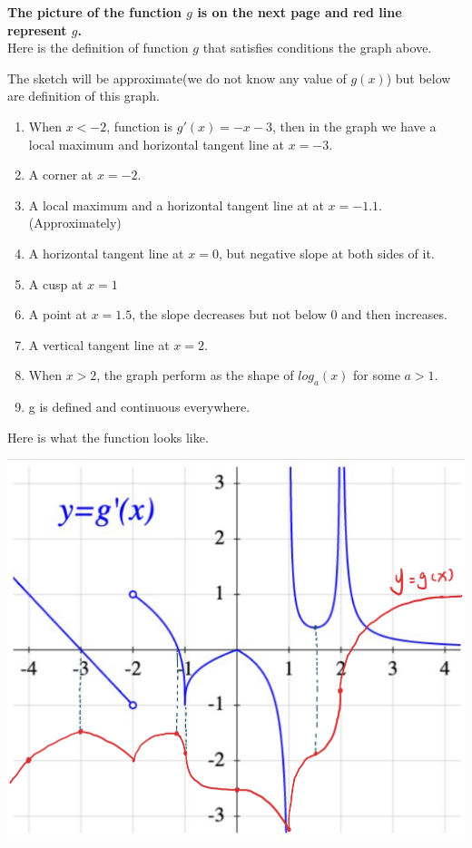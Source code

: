 \documentclass[12pt]{exam}
\newcommand{\vv}{\vspace{.4cm}}
\begin{document}
\textbf{The picture of the function $g$ is on the next page and red line represent $g$.}\\
Here is the definition of function $g$ that satisfies conditions the graph above.\\

\vv

The sketch will be approximate(we do not know any value of $g(x)$) but below are definition of this graph.

\begin{enumerate}
	\item When $x<-2$, function is $g'(x)=-x-3$, then in the graph we have a local maximum and horizontal tangent line at $x=-3$.
	\item A corner at $x=-2$.
	\item A local maximum and a horizontal tangent line at at $x=-1.1$.(Approximately)
	\item A horizontal tangent line at $x=0$, but negative slope at both sides of it.
	\item A cusp at $x=1$
	\item A point at $x=1.5$, the slope decreases but not below 0 and then increases.
	\item A vertical tangent line at $x=2$.
	\item When $x>2$, the graph perform as the shape of $log_a(x)$ for some $a>1$.
	\item g is defined and continuous everywhere.
\end{enumerate}


\newpage
Here is what the function looks like.
\vv

\includegraphics[scale = 0.5]{function graph.png}
\end{document}
